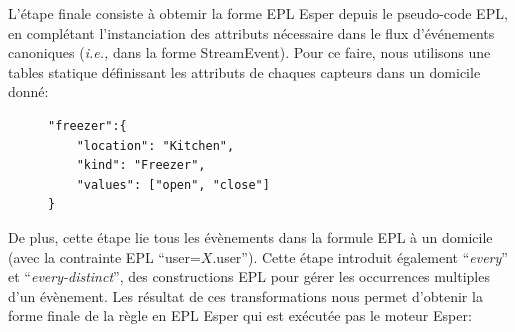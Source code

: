 L'étape finale consiste à obtemir la forme EPL Esper depuis le pseudo-code EPL, en complétant l'instanciation des attributs nécessaire dans le flux d'événements canoniques ({\em i.e.,} dans la forme StreamEvent). Pour ce faire, nous utilisons une tables statique définissant les attributs de chaques capteurs dans un domicile donné:

\begin{figure}[h]
\begin{footnotesize}
\begin{Verbatim}
"freezer":{
	"location": "Kitchen",
	"kind": "Freezer",
	"values": ["open", "close"]
}
\end{Verbatim}
\end{footnotesize}
\end{figure}

De plus, cette étape lie tous les évènements dans la formule EPL à un domicile (avec la contrainte EPL ``{\ttfamily user=$X$.user}''). Cette étape introduit également ``{\em every}'' et ``{\em every-distinct}'', des constructions EPL pour gérer les occurrences multiples d'un évènement. Les résultat de ces transformations nous permet d'obtenir la forme finale de la règle en EPL Esper qui est exécutée pas le moteur Esper:

